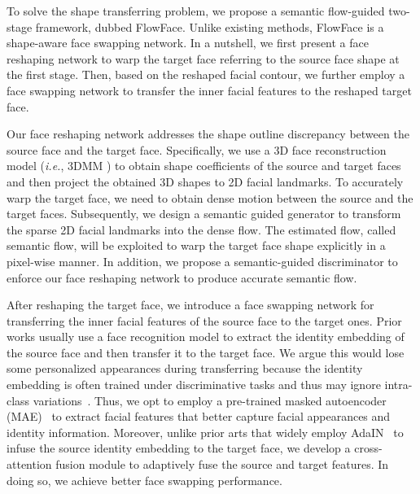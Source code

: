 To solve the shape transferring problem, we propose a semantic flow-guided two-stage framework, dubbed FlowFace. Unlike existing methods, FlowFace is a shape-aware face swapping network. 
In a nutshell, we first present a face reshaping network to warp the target face referring to the source face shape at the first stage. Then, based on the reshaped facial contour, we further employ a face swapping network to transfer the inner facial features to the reshaped target face.

Our face reshaping network addresses the shape outline discrepancy between the source face and the target face.
Specifically, we use a 3D face reconstruction model (\emph{i.e.}, 3DMM \cite{blanz19993DMM}) to obtain shape coefficients of the source and target faces and then project the obtained 3D shapes to 2D facial landmarks. 
To accurately warp the target face, we need to obtain dense motion between the source and the target faces. Subsequently, we design a semantic guided generator to transform the sparse 2D facial landmarks into the dense flow.
The estimated flow, called semantic flow, will be exploited to warp the target face shape explicitly in a pixel-wise manner. In addition, we propose a semantic-guided discriminator to enforce our face reshaping network to produce accurate semantic flow.

After reshaping the target face, we introduce a face swapping network for transferring the inner facial features of the source face to the target ones. 
Prior works usually use a face recognition model to extract the identity embedding of the source face and then transfer it to the target face. 
We argue this would lose some personalized appearances during transferring because the identity embedding is often trained under discriminative tasks and thus may ignore intra-class variations~\cite{kim2022smooth}.
Thus, we opt to employ a pre-trained masked autoencoder (MAE)~\cite{he2022mae} to extract facial features that better capture facial appearances and identity information. 
Moreover, unlike prior arts that widely employ AdaIN~\cite{liu2017adaptive} to infuse the source identity embedding to the target face, we develop a cross-attention fusion module to adaptively fuse the source and target features.
In doing so, we achieve better face swapping performance.

